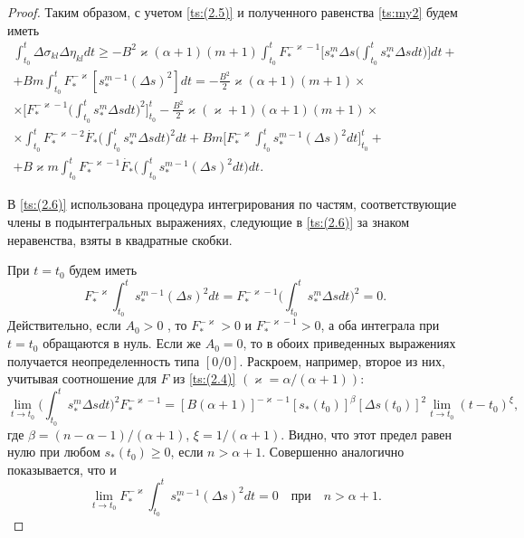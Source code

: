 \begin{proof}
Таким образом, с учетом \eqref{ts:(2.5)}  и полученного равенства \eqref{ts:my2} будем иметь
\begin{multline}
\label{ts:(2.6)}
\int_{t_{0}}^{t}\Delta\sigma_{kl}\Delta\eta_{kl}dt\geq-B^{2}\varkappa(\alpha+1)(m+1) \int_{t_{0}}^{t}F_{*}^{-\varkappa-1}\biggl[s_{*}^{m}\Delta s\biggl(\int_{t_{0}}^{t}s_{*}^{m}\Delta sdt\biggr)\biggr]dt+
\\
+Bm\int_{t_{0}}^{t}F_{*}^{-\varkappa}\left[s_{*}^{m-1}(\Delta s)^{2}\right]dt=-\frac{B^{2}}{2}\varkappa(\alpha+1)(m+1)\times
\\
\times\biggl[F_{*}^{-\varkappa-1}\biggl(\int_{t_{0}}^{t}s_{*}^{m}\Delta s dt\biggr)^{2}\biggr]_{t_{0}}^{t}-\frac{B^{2}}{2}\varkappa(\varkappa+1)(\alpha+1)(m+1)\times
\\
\times\int_{t_{0}}^{t}F_{*}^{-\varkappa-2} \dot{F_{*}}\biggl(\int_{t_{0}}^{t}s_{*}^{m}\Delta s dt\biggr)^{2}dt+Bm\biggr[F_{*}^{-\varkappa}\int_{t_{0}}^{t}s_{*}^{m-1}(\Delta s)^{2}dt\biggr]_{t_{0}}^{t}+
\\
+B\varkappa m\int_{t_{0}}^{t}F_{*}^{-\varkappa-1}\dot{F_{*}}\biggl(\int_{t_{0}}^{t}s_{*}^{m-1}
(\Delta s)^{2}dt\biggr)dt.
\end{multline}

В \eqref{ts:(2.6)} использована процедура интегрирования по частям, соответствующие члены в подынтегральных выражениях, следующие в \eqref{ts:(2.6)}  за знаком неравенства, взяты в квадратные скобки.

При $t=t_{0}$ будем иметь
$$
F_{*}^{-\varkappa}\int_{t_{0}}^{t}s_{*}^{m-1}(\Delta s)^{2}dt=F_{*}^{-\varkappa-1}\biggl(\int_{t_{0}}^{t}s_{*}^{m}\Delta s dt\biggr)^{2}=0.
$$
Действительно, если $A_{0}>0$ , то $F_{*}^{-\varkappa}>0$ и $F_{*}^{-\varkappa-1}>0$, а оба интеграла при $t=t_{0}$ обращаются в нуль. 
Если же $A_{0}=0$, то в обоих приведенных выражениях получается неопределенность типа $[0/0]$. 
Раскроем, например, второе из них, учитывая соотношение для $F$ из \eqref{ts:(2.4)}  $(\varkappa=\alpha/(\alpha+1))$:
$$
\lim_{t\to {t_{0}}}\biggl(\int_{t_{0}}^{t}s_{*}^{m}\Delta s dt\biggr)^{2}F_{*}^{-\varkappa-1}= \left[B(\alpha+1)\right]^{-\varkappa-1}\left[s_{*}(t_{0})\right]^{\beta}\left[\Delta s(t_{0})\right]^{2}\lim_{t\to {t_{0}}}(t-t_{0})^{\xi},$$
где $\beta=(n-\alpha-1)/(\alpha+1)$, $\xi=1/(\alpha+1)$.
Видно, что этот предел равен нулю при любом $s_{*}(t_{0})\geq0$, если $n>\alpha+1$. 
Совершенно аналогично показывается, что и 
$$
\lim_{t\to{t_{0}}}F_{*}^{-\varkappa}\int_{t_{0}}^{t}s_{*}^{m-1}(\Delta s)^{2}dt=0\quad  \text{при}\quad   n>\alpha+1.
$$


\end{proof}
